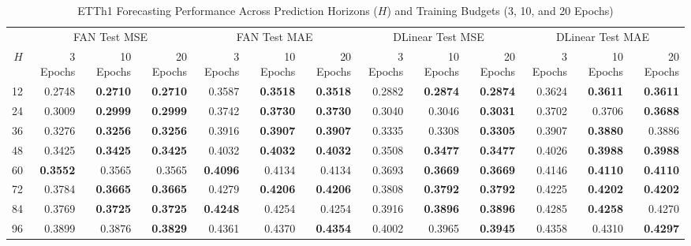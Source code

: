 \documentclass[journal]{IEEEtran}
\begin{document}
\begin{table}[t]
\caption{ETTh1 Forecasting Performance Across Prediction Horizons ($H$) and Training Budgets (3, 10, and 20 Epochs)}
\label{tab:extension_etth1}
\centering
\scriptsize
\setlength{\tabcolsep}{4.5pt}
\begin{tabular}{@{}r|rrr|rrr|rrr|rrr@{}}
\toprule
 & \multicolumn{3}{c|}{FAN Test MSE} & \multicolumn{3}{c|}{FAN Test MAE} & \multicolumn{3}{c|}{DLinear Test MSE} & \multicolumn{3}{c}{DLinear Test MAE}\\
$H$ & 3 Epochs & 10 Epochs & 20 Epochs & 3 Epochs & 10 Epochs & 20 Epochs & 3 Epochs & 10 Epochs & 20 Epochs & 3 Epochs & 10 Epochs & 20 Epochs\\
\midrule
12 & 0.2748 & \textbf{0.2710} & \textbf{0.2710} & 0.3587 & \textbf{0.3518} & \textbf{0.3518} & 0.2882 & \textbf{0.2874} & \textbf{0.2874} & 0.3624 & \textbf{0.3611} & \textbf{0.3611}\\
24 & 0.3009 & \textbf{0.2999} & \textbf{0.2999} & 0.3742 & \textbf{0.3730} & \textbf{0.3730} & 0.3040 & 0.3046 & \textbf{0.3031} & 0.3702 & 0.3706 & \textbf{0.3688}\\
36 & 0.3276 & \textbf{0.3256} & \textbf{0.3256} & 0.3916 & \textbf{0.3907} & \textbf{0.3907} & 0.3335 & 0.3308 & \textbf{0.3305} & 0.3907 & \textbf{0.3880} & 0.3886\\
48 & 0.3425 & \textbf{0.3425} & \textbf{0.3425} & 0.4032 & \textbf{0.4032} & \textbf{0.4032} & 0.3508 & \textbf{0.3477} & \textbf{0.3477} & 0.4026 & \textbf{0.3988} & \textbf{0.3988}\\
60 & \textbf{0.3552} & 0.3565 & 0.3565 & \textbf{0.4096} & 0.4134 & 0.4134 & 0.3693 & \textbf{0.3669} & \textbf{0.3669} & 0.4146 & \textbf{0.4110} & \textbf{0.4110}\\
72 & 0.3784 & \textbf{0.3665} & \textbf{0.3665} & 0.4279 & \textbf{0.4206} & \textbf{0.4206} & 0.3808 & \textbf{0.3792} & \textbf{0.3792} & 0.4225 & \textbf{0.4202} & \textbf{0.4202}\\
84 & 0.3769 & \textbf{0.3725} & \textbf{0.3725} & \textbf{0.4248} & 0.4254 & 0.4254 & 0.3916 & \textbf{0.3896} & \textbf{0.3896} & 0.4285 & \textbf{0.4258} & 0.4270\\
96 & 0.3899 & 0.3876 & \textbf{0.3829} & 0.4361 & 0.4370 & \textbf{0.4354} & 0.4002 & 0.3965 & \textbf{0.3945} & 0.4358 & 0.4310 & \textbf{0.4297}\\
\bottomrule
\end{tabular}
\end{table}
\end{document}

